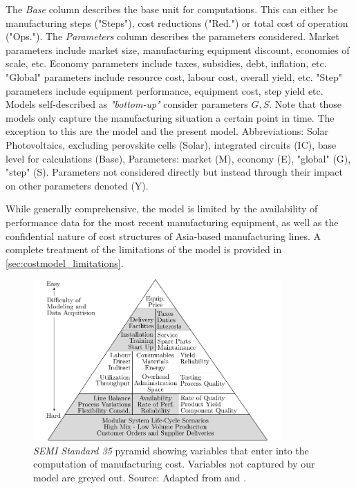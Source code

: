 \documentclass[parskip=full]{article}
\begin{document}
\begin{table}[h!]
\vspace{3mm}
\caption*{The \textit{Base} column describes the base unit for computations. This can either be manufacturing steps ("Steps"), cost reductions ("Red.") or total cost of operation ("Ops."). The \textit{Parameters} column describes the parameters considered. Market parameters include market size, manufacturing equipment discount, economies of scale, etc. Economy parameters include taxes, subsidies, debt, inflation, etc. "Global" parameters include resource cost, labour cost, overall yield, etc. "Step" parameters include equipment performance, equipment cost, step yield etc. Models self-described as \textit{"bottom-up"} consider parameters $G,S$. Note that those models only capture the manufacturing situation a certain point in time. The exception to this are the model \cite{Elia2020} and the present model. Abbreviations: Solar Photovoltaics, excluding perovskite cells (Solar), integrated circuits (IC), base level for calculations (Base), Parameters: market (M), economy (E), "global" (G), "step" (S). Parameters not considered directly but instead through their impact on other parameters denoted (Y).}
\label{tab:costmodels}
\end{table}

While generally comprehensive, the model is limited by the availability of performance data for the most recent manufacturing equipment, as well as the confidential nature of cost structures of Asia-based manufacturing lines. A complete treatment of the limitations of the model is provided in \cref{sec:costmodel_limitations}.

\begin{figure}[h!]
    \centering
    \includegraphics[width=0.85\textwidth]{./figures/SEMI_pyramid.pdf}
    \caption{\textit{SEMI Standard 35} pyramid showing variables that enter into the computation of manufacturing cost. Variables not captured by our model are greyed out. Source: Adapted from \cite{standardE35} and \cite{helin200618th}.}
    \label{fig:semi_pyramid}
\end{figure}
\end{document}
